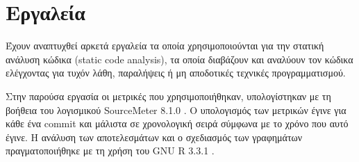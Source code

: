 \section{Εργαλεία}

Έχουν αναπτυχθεί αρκετά εργαλεία τα οποία χρησιμοποιούνται για την στατική ανάλυση κώδικα (static code analysis), τα οποία διαβάζουν και αναλύουν τον κώδικα ελέγχοντας για τυχόν λάθη, παραλήψεις ή μη αποδοτικές τεχνικές προγραμματισμού.

Στην παρούσα εργασία οι μετρικές που χρησιμοποιήθηκαν, υπολογίστηκαν με τη βοήθεια του λογισμικού SourceMeter 8.1.0 \cite{SOURCEMETER}. Ο υπολογισμός των μετρικών έγινε για κάθε ένα commit και μάλιστα σε χρονολογική σειρά σύμφωνα με το χρόνο που αυτό έγινε. Η ανάλυση των αποτελεσμάτων και ο σχεδιασμός των γραφημάτων πραγματοποιήθηκε με τη χρήση του GNU R 3.3.1 \cite{R}.
